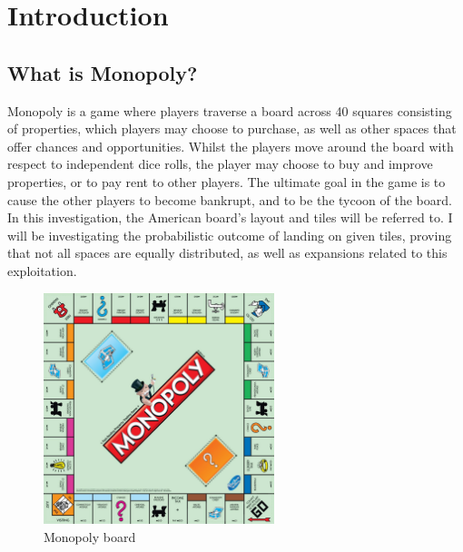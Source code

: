 \documentclass[12pt]{article}
\begin{document}
\tableofcontents
\thispagestyle{empty}
\cleardoublepage
\setcounter{page}{1}


\section{Introduction}
\subsection{What is Monopoly?}
Monopoly is a game where players traverse a board across 40 squares consisting of properties, which players may choose to purchase, as well as other spaces that offer chances and opportunities. Whilst the players move around the board with respect to independent dice rolls, the player may choose to buy and improve properties, or to pay rent to other players. The ultimate goal in the game is to cause the other players to become bankrupt, and to be the tycoon of the board. In this investigation, the American board's layout and tiles will be referred to. I will be investigating the probabilistic outcome of landing on given tiles, proving that not all spaces are equally distributed, as well as expansions related to this exploitation.
\begin{figure}[h]
\centering
\includegraphics[width=0.6\textwidth]{board.jpg}
\caption{Monopoly board}
\end{figure}
\end{document}
